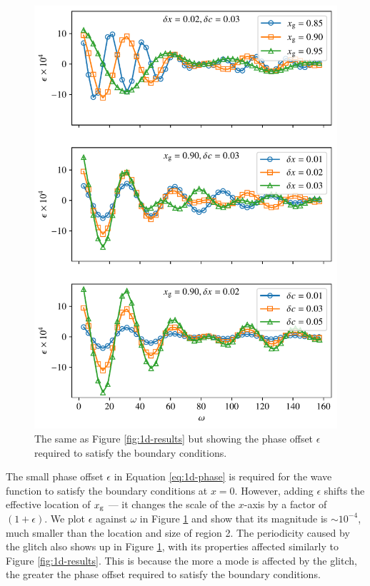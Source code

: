 
\begin{figure}
    \centering
    \includegraphics{figures/glitch-1d-example-phase.pdf}
    \caption[The same as Figure \ref{fig:1d-results} but showing the phase offset required to satisfy the boundary conditions.]{The same as Figure \ref{fig:1d-results} but showing the phase offset \(\epsilon\) required to satisfy the boundary conditions.}
    \label{fig:1d-phase}
\end{figure}

The small phase offset \(\epsilon\) in Equation \ref{eq:1d-phase} is required for the wave function to satisfy the boundary conditions at \(x = 0\). However, adding \(\epsilon\) shifts the effective location of \(x_{{\mathrm{g}}}\) --- it changes the scale of the \(x\)-axis by a factor of \((1 + \epsilon)\). We plot \(\epsilon\) against \(\omega\) in Figure \ref{fig:1d-phase} and show that its magnitude is \(\sim 10^{-4}\), much smaller than the location and size of region 2. The periodicity caused by the glitch also shows up in Figure \ref{fig:1d-phase}, with its properties affected similarly to Figure \ref{fig:1d-results}. This is because the more a mode is affected by the glitch, the greater the phase offset required to satisfy the boundary conditions.

